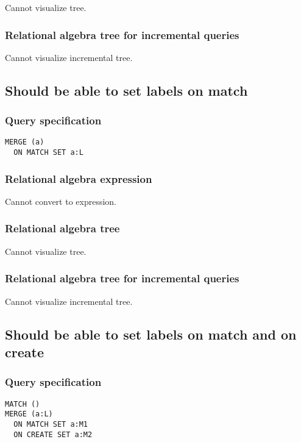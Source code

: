 Cannot visualize tree.

\subsubsection*{Relational algebra tree for incremental queries}

Cannot visualize incremental tree.

\subsection{Should be able to set labels on match}

\subsubsection*{Query specification}

\begin{lstlisting}
MERGE (a)
  ON MATCH SET a:L
\end{lstlisting}

\subsubsection*{Relational algebra expression}

Cannot convert to expression.

\subsubsection*{Relational algebra tree}

Cannot visualize tree.

\subsubsection*{Relational algebra tree for incremental queries}

Cannot visualize incremental tree.

\subsection{Should be able to set labels on match and on create}

\subsubsection*{Query specification}

\begin{lstlisting}
MATCH ()
MERGE (a:L)
  ON MATCH SET a:M1
  ON CREATE SET a:M2
\end{lstlisting}

